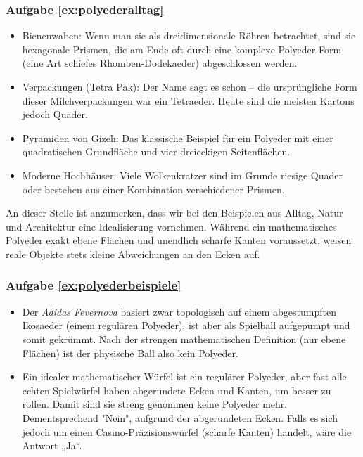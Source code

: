 \subsubsection*{Aufgabe \ref{ex:polyederalltag}}
\begin{itemize}
    \item Bienenwaben: Wenn man sie als dreidimensionale Röhren betrachtet, sind sie hexagonale Prismen, die am Ende oft durch eine komplexe Polyeder-Form (eine Art schiefes Rhomben-Dodekaeder) abgeschlossen werden.
    \item Verpackungen (Tetra Pak): Der Name sagt es schon – die ursprüngliche Form dieser Milchverpackungen war ein Tetraeder. Heute sind die meisten Kartons jedoch Quader.
    \item Pyramiden von Gizeh: Das klassische Beispiel für ein Polyeder mit einer quadratischen Grundfläche und vier dreieckigen Seitenflächen.
    \item Moderne Hochhäuser: Viele Wolkenkratzer sind im Grunde riesige Quader oder bestehen aus einer Kombination verschiedener Prismen.
\end{itemize}

An dieser Stelle ist anzumerken, dass wir bei den Beispielen aus Alltag, Natur und Architektur eine Idealisierung vornehmen. Während ein mathematisches Polyeder exakt ebene Flächen und unendlich scharfe Kanten voraussetzt, weisen reale Objekte stets kleine Abweichungen an den Ecken auf.


\subsubsection*{Aufgabe \ref{ex:polyederbeispiele}}
\begin{itemize}
    \item[a)] Der \textit{Adidas Fevernova} basiert zwar topologisch auf einem abgestumpften Ikosaeder (einem regulären Polyeder), ist aber als Spielball aufgepumpt und somit gekrümmt. Nach der strengen mathematischen Definition (nur ebene Flächen) ist der physische Ball also kein Polyeder. 
    \item[b)] Ein idealer mathematischer Würfel ist ein regulärer Polyeder, aber fast alle echten Spielwürfel haben abgerundete Ecken und Kanten, um besser zu rollen. Damit sind sie streng genommen keine Polyeder mehr. Dementsprechend "Nein", aufgrund der abgerundeten Ecken. Falls es sich jedoch um einen Casino-Präzisionswürfel (scharfe Kanten) handelt, wäre die Antwort „Ja“. 
\end{itemize}


